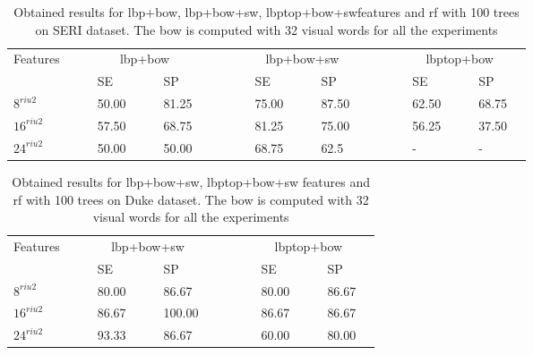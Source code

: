 \begin{table}
\caption{Obtained results for \ac{lbp}+\ac{bow}, \ac{lbp}+\ac{bow}+\ac{sw}, \ac{lbptop}+\ac{bow}+\ac{sw}features and \ac{rf} with 100 trees on SERI dataset. The \ac{bow} is computed with 32 visual words for all the experiments}
\centering
\begin{tabular}{lcclcclcccclcclcccclcclc}
\toprule
Features 	& & &\multicolumn{4}{c}{\ac{lbp}+\ac{bow}}&	 & & & &\multicolumn{4}{c}{\ac{lbp}+\ac{bow}+\ac{sw}}& & & & &\multicolumn{4}{c}{\ac{lbptop}+\ac{bow}} &\\
  \cmidrule(l){2-8}  \cmidrule(l){10-16}  \cmidrule(l){18-24}
	       & & & SE & & & SP & & & & & SE & & & SP & & & & & SE & & & SP & \\
\midrule
 $8^{riu2}$ 						& & & 50.00 & & & 81.25 & & & & & 75.00 & & & 87.50 & & & & & 62.50 & & & 68.75 & \\	
 $16^{riu2}$						& & & 57.50 & & & 68.75 & & & & & 81.25 & & & 75.00 & & & & & 56.25 & & & 37.50 & \\	
 $24^{riu2}$						& & & 50.00 & & & 50.00 & & & & & 68.75 & & & 62.5 & & & & & - & & & - & \\
\bottomrule
\end{tabular}
\label{tab:SERIBoWResult}
\end{table}


\begin{table}
\caption{Obtained results for \ac{lbp}+\ac{bow}+\ac{sw}, \ac{lbptop}+\ac{bow}+\ac{sw} features and \ac{rf} with 100 trees on Duke dataset. The \ac{bow} is computed with 32 visual words for all the experiments}
\centering
\begin{tabular}{lcclcclcccclcclc}
\toprule
Features 	& & &\multicolumn{4}{c}{\ac{lbp}+\ac{bow}+\ac{sw}}&	 & & & &\multicolumn{4}{c}{\ac{lbptop}+\ac{bow}} &\\
  \cmidrule(l){2-8}  \cmidrule(l){10-16}  
	       & & & SE & & & SP & & & & & SE & & & SP& \\
\midrule
 $8^{riu2}$ 						& & & 80.00 & & & 86.67 & & & & & 80.00 & & & 86.67 & \\	
 $16^{riu2}$						& & & 86.67 & & & 100.00 & & & & & 86.67 & & & 86.67 & \\	
 $24^{riu2}$						& & & 93.33 & & & 86.67 & & & & & 60.00 & & & 80.00 & \\
\bottomrule
\end{tabular}
\label{tab:DukeBoWResult}
\end{table}




